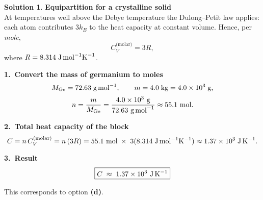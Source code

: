 \documentclass[12pt]{article}
\theoremstyle{definition} %
\newtheorem{solution}{Solution}
\theoremstyle{plain} %
\begin{document}
                          \begin{solution}
                            \textbf{Equipartition for a crystalline solid}\\
                            At temperatures well above the Debye temperature the Dulong--Petit law
                            applies: each atom contributes \(3k_B\) to the heat capacity at constant
                            volume.  Hence, per \emph{mole},
                            \[
                            C_V^{\text{(molar)}} = 3R,
                            \]
                            where \(R = 8.314\;\text{J\,mol}^{-1}\text{K}^{-1}\).
                            
                            \medskip
                            \textbf{1.\ Convert the mass of germanium to moles}
                            \[
                            M_{\text{Ge}} = 72.63\;\text{g\,mol}^{-1}, 
                            \qquad
                            m = 4.0\;\text{kg} = 4.0\times10^{3}\;\text{g},
                            \]
                            \[
                            n = \frac{m}{M_{\text{Ge}}}
                              = \frac{4.0\times10^{3}\ \text{g}}{72.63\ \text{g\,mol}^{-1}}
                              \approx 55.1\ \text{mol}.
                            \]
                            
                            \medskip
                            \textbf{2.\ Total heat capacity of the block}
                            \[
                            C = n\,C_V^{\text{(molar)}} 
                              = n\,(3R)
                              = 55.1\ \text{mol}\;\times\;3(8.314\;\text{J\,mol}^{-1}\text{K}^{-1})
                              \approx 1.37\times10^{3}\;\text{J\,K}^{-1}.
                            \]
                            
                            \medskip
                            \textbf{3.\ Result}\\
                            \[
                            \boxed{C \;\approx\; 1.37 \times 10^{3}\ \text{J\,K}^{-1}}
                            \]
                            
                            This corresponds to option \textbf{(d)}.
                            \end{solution}
                            \pagebreak
\end{document}

